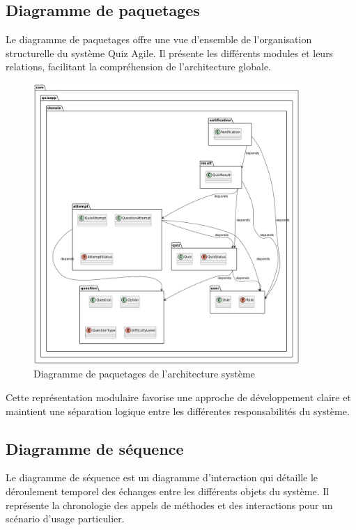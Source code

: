 \documentclass[12pt,a4paper]{report}
\begin{document}
\subsection{Diagramme de paquetages}

Le diagramme de paquetages offre une vue d'ensemble de l'organisation structurelle du système Quiz Agile. Il présente les différents modules et leurs relations, facilitant la compréhension de l'architecture globale.

\begin{figure}[H]
\centering
\includegraphics[width=0.9\textwidth]{latex_media/media/image17.png}
\caption{Diagramme de paquetages de l'architecture système}
\label{fig:diagramme-paquetages}
\end{figure}

Cette représentation modulaire favorise une approche de développement claire et maintient une séparation logique entre les différentes responsabilités du système.

\subsection{Diagramme de séquence}

Le diagramme de séquence est un diagramme d'interaction qui détaille le déroulement temporel des échanges entre les différents objets du système. Il représente la chronologie des appels de méthodes et des interactions pour un scénario d'usage particulier.
\end{document}
